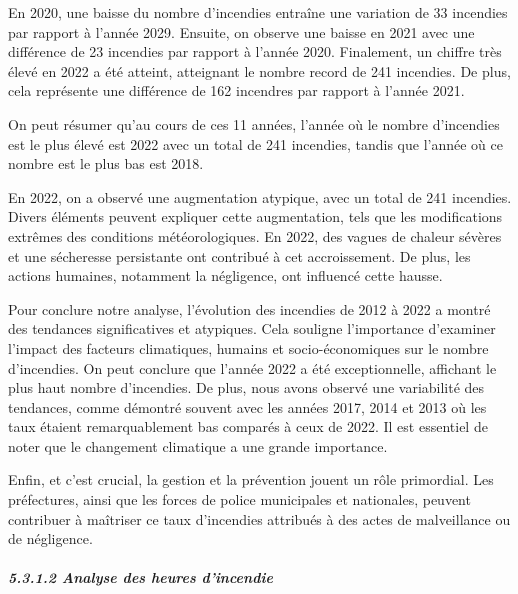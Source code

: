 \documentclass[
]{article}
\begin{document}
En 2020, une baisse du nombre d'incendies entraîne une variation de 33
incendies par rapport à l'année 2029. Ensuite, on observe une baisse en
2021 avec une différence de 23 incendies par rapport à l'année 2020.
Finalement, un chiffre très élevé en 2022 a été atteint, atteignant le
nombre record de 241 incendies. De plus, cela représente une différence
de 162 incendres par rapport à l'année 2021.

On peut résumer qu'au cours de ces 11 années, l'année où le nombre
d'incendies est le plus élevé est 2022 avec un total de 241 incendies,
tandis que l'année où ce nombre est le plus bas est 2018.

En 2022, on a observé une augmentation atypique, avec un total de 241
incendies. Divers éléments peuvent expliquer cette augmentation, tels
que les modifications extrêmes des conditions météorologiques. En 2022,
des vagues de chaleur sévères et une sécheresse persistante ont
contribué à cet accroissement. De plus, les actions humaines, notamment
la négligence, ont influencé cette hausse.

Pour conclure notre analyse, l'évolution des incendies de 2012 à 2022 a
montré des tendances significatives et atypiques. Cela souligne
l'importance d'examiner l'impact des facteurs climatiques, humains et
socio-économiques sur le nombre d'incendies. On peut conclure que
l'année 2022 a été exceptionnelle, affichant le plus haut nombre
d'incendies. De plus, nous avons observé une variabilité des tendances,
comme démontré souvent avec les années 2017, 2014 et 2013 où les taux
étaient remarquablement bas comparés à ceux de 2022. Il est essentiel de
noter que le changement climatique a une grande importance.

Enfin, et c'est crucial, la gestion et la prévention jouent un rôle
primordial. Les préfectures, ainsi que les forces de police municipales
et nationales, peuvent contribuer à maîtriser ce taux d'incendies
attribués à des actes de malveillance ou de négligence.

\subparagraph{5.3.1.2 Analyse des heures
d'incendie}\label{analyse-des-heures-dincendie}
\end{document}
